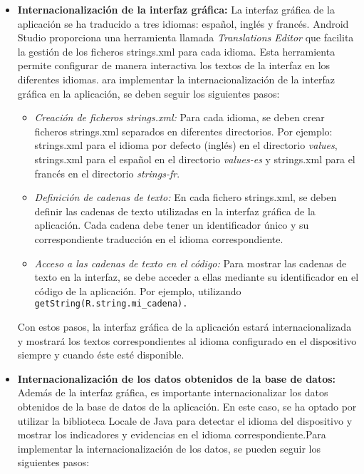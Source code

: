 \begin{itemize}
    \item \textbf{Internacionalización de la interfaz gráfica: }La interfaz
    gráfica de la aplicación se ha traducido a tres idiomas: español, inglés y
    francés. Android Studio proporciona una herramienta llamada\textit{
    Translations Editor} que facilita la gestión de los ficheros strings.xml
    para cada idioma. Esta herramienta permite configurar de manera interactiva
    los textos de la interfaz en los diferentes idiomas. ara implementar la
    internacionalización de la interfaz gráfica en la aplicación, se deben
    seguir los siguientes pasos:
    \begin{itemize}
        \item \textit{Creación de ficheros strings.xml:} Para cada idioma, se deben crear
        ficheros strings.xml separados en diferentes directorios. Por ejemplo:
        strings.xml para el idioma por defecto (inglés) en el directorio
        \textit{values}, strings.xml para el español en el directorio
        \textit{values-es} y strings.xml para el francés en el directorio \textit{strings-fr}.
    
        \item \textit{Definición de cadenas de texto:} En cada fichero strings.xml, se
        deben definir las cadenas de texto utilizadas en la interfaz gráfica de
        la aplicación. Cada cadena debe tener un identificador único y su
        correspondiente traducción en el idioma correspondiente.
        
        \item \textit{Acceso a las cadenas de texto en el código:} Para mostrar las
        cadenas de texto en la interfaz, se debe acceder a ellas mediante su
        identificador en el código de la aplicación. Por ejemplo, utilizando
        \texttt{getString(R.string.mi\_cadena).}
    
        
        
    \end{itemize}
    Con estos pasos, la interfaz gráfica de la aplicación estará
    internacionalizada y mostrará los textos correspondientes al idioma
    configurado en el dispositivo siempre y cuando éste esté disponible.
    \item \textbf{Internacionalización de los datos obtenidos de la base de
    datos: }Además de la interfaz gráfica, es importante internacionalizar los
    datos obtenidos de la base de datos de la aplicación. En este caso, se ha
    optado por utilizar la biblioteca Locale de Java para detectar el idioma del
    dispositivo y mostrar los indicadores y evidencias en el idioma
    correspondiente.Para implementar la internacionalización de los datos, se
    pueden seguir los siguientes pasos:
    

\end{itemize}
